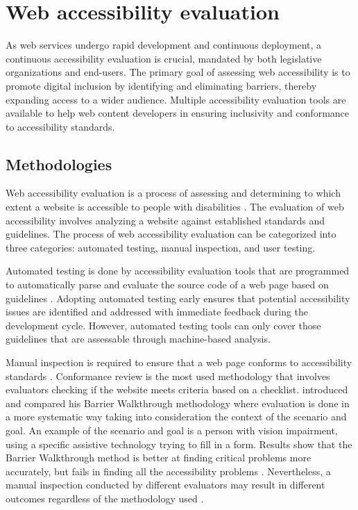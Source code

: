 \chapter{Web accessibility evaluation\label{accessibility_evaluation}}

As web services undergo rapid development and continuous deployment, a continuous accessibility evaluation is crucial, mandated by both legislative organizations and end-users. The primary goal of assessing web accessibility is to promote digital inclusion by identifying and eliminating barriers, thereby expanding access to a wider audience. Multiple accessibility evaluation tools are available to help web content developers in ensuring inclusivity and conformance to accessibility standards.

\section{Methodologies}

Web accessibility evaluation is a process of assessing and determining to which extent a website is accessible to people with disabilities \citep[Chapter~26.2]{webaccessibility}. The evaluation of web accessibility involves analyzing a website against established standards and guidelines. The process of web accessibility evaluation can be categorized into three categories: automated testing, manual inspection, and user testing.

Automated testing is done by accessibility evaluation tools that are programmed to automatically parse and evaluate the source code of a web page based on guidelines \citep[Chapter~26.2]{webaccessibility}. Adopting automated testing early ensures that potential accessibility issues are identified and addressed with immediate feedback during the development cycle. However, automated testing tools can only cover those guidelines that are assessable through machine-based analysis.

Manual inspection is required to ensure that a web page conforms to accessibility standards \citep[Chapter~26.2]{webaccessibility}. Conformance review is the most used methodology that involves evaluators checking if the website meets criteria based on a checklist. \textcite{comparative_accessibility_methods} introduced and compared his Barrier Walkthrough methodology where evaluation is done in a more systematic way taking into consideration the context of the scenario and goal. An example of the scenario and goal is a person with vision impairment, using a specific assistive technology trying to fill in a form. Results show that the Barrier Walkthrough method is better at finding critical problems more accurately, but fails in finding all the accessibility problems \citep{comparative_accessibility_methods}. Nevertheless, a manual inspection conducted by different evaluators may result in different outcomes regardless of the methodology used \citep{accessibility_evaluation_experts, 10.1145/1878803.1878813_testability_expertise}. 

